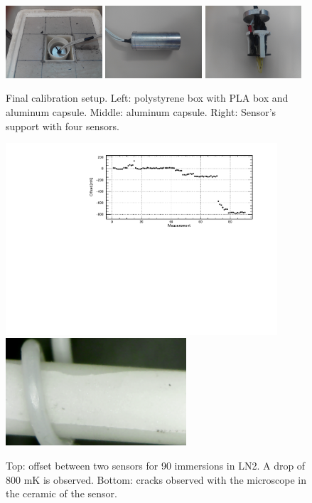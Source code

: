 \begin{figure}[htbp]
\centering
\includegraphics[width=0.32\textwidth]{images/figure_4_a.jpg}
\includegraphics[width=0.32\textwidth]{images/figure_4_b.jpg}
\includegraphics[width=0.32\textwidth]{images/figure_4_c.jpg}
\caption{Final calibration setup. Left: polystyrene box with PLA box and aluminum capsule. Middle: aluminum capsule. Right: Sensor's support with four sensors. 
\label{fig:setup_final}}
\end{figure}

\begin{figure}[htbp]
\centering
\includegraphics[width=0.9\textwidth]{images/figure_5_a.pdf}
\includegraphics[width=0.6\textwidth]{images/figure_5_b.png}
\caption{Top: offset between two sensors for 90 immersions in LN2. A drop of 800 mK is observed. Bottom: cracks observed with the microscope in the ceramic of the sensor. 
\label{fig:broken_sensor_evolution}}
\end{figure}

